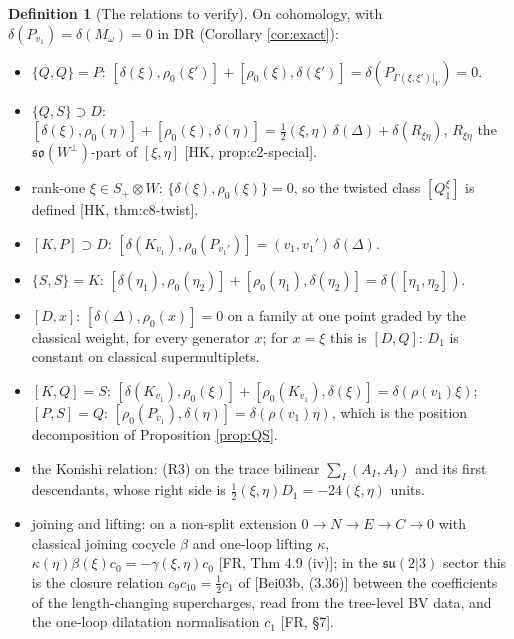 \documentclass[11pt]{article}
\theoremstyle{definition}
\newtheorem{definition}{Definition}[section]
\numberwithin{equation}{section}
\begin{document}
\begin{definition}[The relations to verify]
\label{def:rels}
On cohomology, with $\delta(P_{v_1})=\delta(M_\omega)=0$ in DR (Corollary \ref{cor:exact}):
\begin{itemize}
\item[(R2)] $\{Q,Q\}=P$: $[\delta(\xi),\rho_0(\xi')]+[\rho_0(\xi),\delta(\xi')]=\delta(P_{\Gamma(\xi,\xi')|_V})=0$.
\item[(R3)] $\{Q,S\}\supset D$: $[\delta(\xi),\rho_0(\eta)]+[\rho_0(\xi),\delta(\eta)]=\frac12(\xi,\eta)\,\delta(\Delta)+\delta(R_{\xi\eta})$, $R_{\xi\eta}$ the $\mathfrak{so}(W^\perp)$-part of $[\xi,\eta]$ [HK, prop:c2-special].
\item[(R4)] rank-one $\xi\in S_+\otimes W$: $\{\delta(\xi),\rho_0(\xi)\}=0$, so the twisted class $[Q^\xi_1]$ is defined [HK, thm:c8-twist].
\item[(R5)] $[K,P]\supset D$: $[\delta(K_{v_1}),\rho_0(P_{v_1'})]=(v_1,v_1')\,\delta(\Delta)$.
\item[(R6)] $\{S,S\}=K$: $[\delta(\eta_1),\rho_0(\eta_2)]+[\rho_0(\eta_1),\delta(\eta_2)]=\delta([\eta_1,\eta_2])$.
\item[(R7)] $[D,x]$: $[\delta(\Delta),\rho_0(x)]=0$ on a family at one point graded by the classical weight, for every generator $x$; for $x=\xi$ this is $[D,Q]$: $D_1$ is constant on classical supermultiplets.
\item[(R9)] $[K,Q]=S$: $[\delta(K_{v_1}),\rho_0(\xi)]+[\rho_0(K_{v_1}),\delta(\xi)]=\delta(\rho(v_1)\xi)$; $[P,S]=Q$: $[\rho_0(P_{v_1}),\delta(\eta)]=\delta(\rho(v_1)\eta)$, which is the position decomposition of Proposition \ref{prop:QS}.
\item[(R10)] the Konishi relation: (R3) on the trace bilinear $\sum_I(A_I,A_I)$ and its first descendants, whose right side is $\frac12(\xi,\eta)D_1=-24(\xi,\eta)$ units.
\item[(R11)] joining and lifting: on a non-split extension $0\to N\to E\to C\to0$ with classical joining cocycle $\beta$ and one-loop lifting $\kappa$, $\kappa(\eta)\beta(\xi)c_0=-\gamma(\xi,\eta)c_0$ [FR, Thm 4.9 (iv)]; in the $\mathfrak{su}(2|3)$ sector this is the closure relation $c_9c_{10}=\frac12c_1$ of [Bei03b, (3.36)] between the coefficients of the length-changing supercharges, read from the tree-level BV data, and the one-loop dilatation normalisation $c_1$ [FR, §7].
\end{itemize}
\end{definition}
\end{document}
